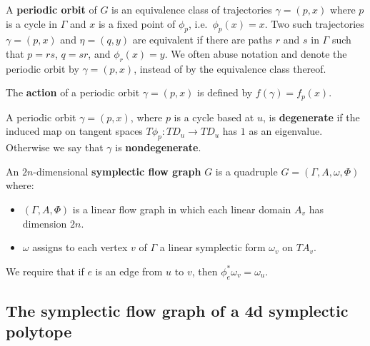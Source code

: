 \begin{definition}
\label{def:flow_graph_periodic_orbit}
A {\bf periodic orbit} of $G$ is an equivalence class of trajectories $\gamma = (p,x)$ where $p$ is a cycle in $\Gamma$ and $x$ is a fixed point of $\phi_p$, i.e.\ $\phi_p(x) = x$. Two such trajectories $\gamma = (p,x)$ and $\eta = (q,y)$ are equivalent if there are paths $r$ and $s$ in $\Gamma$ such that $p = rs$, $q = sr$, and $\phi_r(x) = y$. We often abuse notation and denote the periodic orbit by $\gamma=(p,x)$, instead of by the equivalence class thereof.
\end{definition}

\begin{definition}
\label{def:action_of_periodic_orbit}
The {\bf action} of a periodic orbit $\gamma = (p,x)$ is defined by $f(\gamma) = f_p(x)$.
\end{definition}

\begin{definition} \label{def:degenerate_orbit} A periodic orbit $\gamma = (p,x)$, where $p$ is a cycle based at $u$, is {\bf degenerate} if the induced map on tangent spaces $T\phi_p:TD_u \to TD_u$ has $1$ as an eigenvalue. Otherwise we say that $\gamma$ is {\bf nondegenerate\/}.
\end{definition}

\begin{definition}
\label{def:symplectic_flow_graph}
An $2n$-dimensional {\bf symplectic flow graph\/} $G$ is a quadruple $G = (\Gamma,A,\omega,\Phi)$ where:
\begin{itemize}
	\item $(\Gamma,A,\Phi)$ is a linear flow graph in which each linear domain $A_v$ has dimension $2n$.
	\item $\omega$ assigns to each vertex $v$ of $\Gamma$ a linear symplectic form $\omega_v$ on $TA_v$.
  \end{itemize}
We require that if $e$ is an edge from $u$ to $v$, then $\phi_e^*\omega_v = \omega_u$.
\end{definition}

\subsection{The symplectic flow graph of a 4d symplectic polytope}
\label{subsubsec:symplectic_polytopes}

